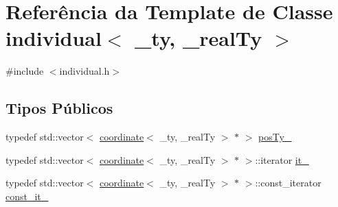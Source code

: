 \hypertarget{classindividual}{
\section{Referência da Template de Classe individual$<$ \_\-ty, \_\-realTy $>$}
\label{classindividual}
}


{\ttfamily \#include $<$individual.h$>$}

\subsection*{Tipos Públicos}
\begin{DoxyCompactItemize}
\item 
typedef std::vector$<$ \hyperlink{classcoordinate}{coordinate}$<$ \_\-ty, \_\-realTy $>$ $\ast$ $>$ \hyperlink{classindividual_a1e5daa9df67df2ce845387ea20c7111e}{posTy\_\-}
\item 
typedef std::vector$<$ \hyperlink{classcoordinate}{coordinate}$<$ \_\-ty, \_\-realTy $>$ $\ast$ $>$::iterator \hyperlink{classindividual_a366746f769614c9cc31b42da59525c6b}{it\_\-}
\item 
typedef std::vector$<$ \hyperlink{classcoordinate}{coordinate}$<$ \_\-ty, \_\-realTy $>$ $\ast$ $>$::const\_\-iterator \hyperlink{classindividual_adcf0ed63de337fb1511eb795502f6e48}{const\_\-it\_\-}
\end{DoxyCompactItemize}

